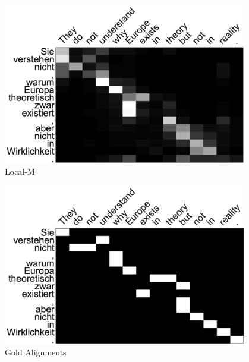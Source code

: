 \documentclass[usenames,dvipsnames]{beamer}
\begin{document}
\begin{frame}
\begin{columns}
    \begin{column}{0.45\textwidth}
      \vspace{-5mm}
    \begin{figure}
      \includegraphics[width=0.95\textwidth]{assets/local_m}
      \caption{Local-M}
    \end{figure}
    \vspace{-7mm}
    \begin{figure}
      \includegraphics[width=0.95\textwidth]{assets/gold}
      \caption{Gold Alignments}
    \end{figure}
    \end{column}

  \end{columns}
\end{frame}
\end{document}
